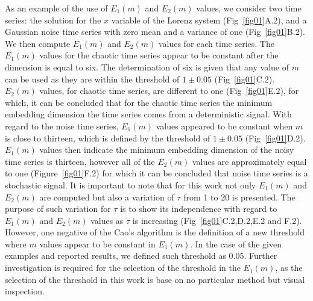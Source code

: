 \documentclass[fleqn,10pt]{wlscirep}
\begin{document}
As an example of the use of $E_1(m)$ and $E_2(m)$ values, we consider two time 
series: the solution for the $x$ variable of the Lorenz system 
(Fig~\ref{fig01}A.2), and a Gaussian noise time series with zero mean
and a variance of one (Fig~\ref{fig01}B.2).
We then compute $E_1(m)$ and $E_2(m)$ values for each time series.
The $E_1(m)$ values for the chaotic time series appear to be constant
after the dimension is equal to six.
The determination of six is given that any value of $m$ can be used as they 
are within the threshold of $1\pm0.05$ (Fig~\ref{fig01}C.2).
$E_2(m)$ values, for chaotic time series, are different to one 
(Fig~\ref{fig01}E.2), for which, it can be concluded that for the
chaotic time series the minimum embedding dimension the time series 
comes from a deterministic signal. With regard to the noise time series,  
$E_1(m)$ values appeared to be constant when $m$ is close to thirteen, 
which is defined by the threshold of $1\pm0.05$ (Fig~\ref{fig01}D.2).
$E_1(m)$ values then indicate the minimum embedding dimension of the 
noisy time series is thirteen, however all of the $E_2(m)$ values are 
approximately equal to one (Figure~\ref{fig01}F.2) for which it can be
concluded that noise time series is a stochastic signal.
It is important to note that for this work not only $E_1(m)$ and $E_2(m)$ are 
computed but also a variation of $\tau$ from 1 to 20 is presented. 
The purpose of such variation for $\tau$ is to show its independence with
regard to $E_1(m)$ and $E_2(m)$ values as $\tau$ is increasing 
(Fig~\ref{fig01}C.2,D.2,E.2 and F.2).
However, one negative of the Cao's algorithm \cite{Cao1997} is the definition of 
a new threshold where $m$ values appear to be constant in $E_1 (m)$.
In the case of the given examples and reported results, we defined such 
threshold as 0.05. Further investigation is required for the selection of the 
threshold in the $E_1(m)$, as the selection of the threshold in this work is 
base on no particular method but visual inspection.

\end{document}

